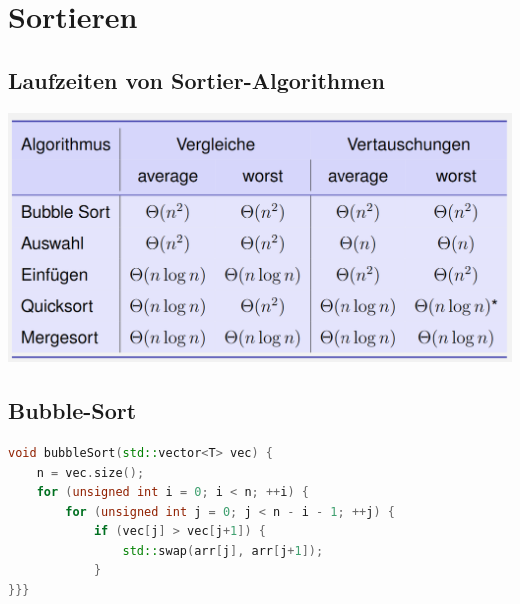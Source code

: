 \section{Sortieren}
\vspace{-4pt}
\begin{sectionbox}
\subsection{Laufzeiten von Sortier-Algorithmen}\smallskip
\begin{center}
    \includegraphics[width = \columnwidth]{../img/LaufzeitenSort.png}
\end{center}
\end{sectionbox}
\vspace{-4pt}
\begin{sectionbox}
\subsection{Bubble-Sort}
\begin{lstlisting}[language=C++]
void bubbleSort(std::vector<T> vec) { 
    n = vec.size();
    for (unsigned int i = 0; i < n; ++i) {
        for (unsigned int j = 0; j < n - i - 1; ++j) {
            if (vec[j] > vec[j+1]) {
                std::swap(arr[j], arr[j+1]);
            }
}}}
\end{lstlisting}\vspace{-6px}
\end{sectionbox}
\vspace{-4pt}
